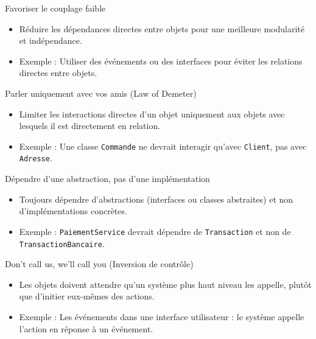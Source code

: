 \documentclass[aspectratio=169]{beamer}
\begin{document}
  \begin{frame}{Favoriser le couplage faible}
  \begin{itemize}
      \item Réduire les dépendances directes entre objets pour une meilleure modularité et indépendance.
      \item Exemple : Utiliser des événements ou des interfaces pour éviter les relations directes entre objets.
  \end{itemize}
  \end{frame}

  \begin{frame}{Parler uniquement avec vos amis (Law of Demeter)}
  \begin{itemize}
      \item Limiter les interactions directes d'un objet uniquement aux objets avec lesquels il est directement en relation.
      \item Exemple : Une classe \texttt{Commande} ne devrait interagir qu'avec \texttt{Client}, pas avec \texttt{Adresse}.
  \end{itemize}
  \end{frame}

  \begin{frame}{Dépendre d'une abstraction, pas d'une implémentation}
  \begin{itemize}
      \item Toujours dépendre d'abstractions (interfaces ou classes abstraites) et non d'implémentations concrètes.
      \item Exemple : \texttt{PaiementService} devrait dépendre de \texttt{Transaction} et non de \texttt{TransactionBancaire}.
  \end{itemize}
  \end{frame}

  \begin{frame}{Don't call us, we'll call you (Inversion de contrôle)}
  \begin{itemize}
      \item Les objets doivent attendre qu'un système plus haut niveau les appelle, plutôt que d'initier eux-mêmes des actions.
      \item Exemple : Les événements dans une interface utilisateur : le système appelle l'action en réponse à un événement.
  \end{itemize}
  \end{frame}
\end{document}
